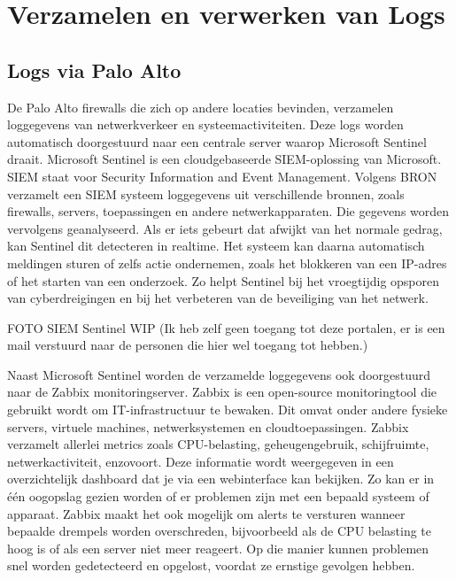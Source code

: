 \section{Verzamelen en verwerken van Logs}

\subsection{Logs via Palo Alto}
De Palo Alto firewalls die zich op andere locaties bevinden, verzamelen loggegevens van netwerkverkeer en systeemactiviteiten. Deze logs worden automatisch doorgestuurd naar een centrale server waarop Microsoft Sentinel draait. Microsoft Sentinel is een cloudgebaseerde SIEM-oplossing van Microsoft. SIEM staat voor Security Information and Event Management.
Volgens BRON verzamelt een SIEM systeem loggegevens uit verschillende bronnen, zoals firewalls, servers, toepassingen en andere netwerkapparaten. Die gegevens worden vervolgens geanalyseerd. Als er iets gebeurt dat afwijkt van het normale gedrag, kan Sentinel dit detecteren in realtime. Het systeem kan daarna automatisch meldingen sturen of zelfs actie ondernemen, zoals het blokkeren van een IP-adres of het starten van een onderzoek. Zo helpt Sentinel bij het vroegtijdig opsporen van cyberdreigingen en bij het verbeteren van de beveiliging van het netwerk.

FOTO SIEM Sentinel WIP (Ik heb zelf geen toegang tot deze portalen, er is een mail verstuurd naar de personen die hier wel toegang tot hebben.)


Naast Microsoft Sentinel worden de verzamelde loggegevens ook doorgestuurd naar de Zabbix monitoringserver. Zabbix is een open-source monitoringtool die gebruikt wordt om IT-infrastructuur te bewaken. Dit omvat onder andere fysieke servers, virtuele machines, netwerksystemen en cloudtoepassingen.
Zabbix verzamelt allerlei metrics zoals CPU-belasting, geheugengebruik, schijfruimte, netwerkactiviteit, enzovoort. Deze informatie wordt weergegeven in een overzichtelijk dashboard dat je via een webinterface kan bekijken. Zo kan er in één oogopslag gezien worden of er problemen zijn met een bepaald systeem of apparaat.
Zabbix maakt het ook mogelijk om alerts te versturen wanneer bepaalde drempels worden overschreden, bijvoorbeeld als de CPU belasting te hoog is of als een server niet meer reageert. Op die manier kunnen problemen snel worden gedetecteerd en opgelost, voordat ze ernstige gevolgen hebben.

